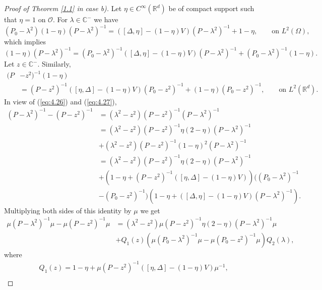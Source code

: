 \documentclass[11pt]{amsart}
\numberwithin{equation}{section}
\def\R{{\mathbb R}}
\begin{document}
\begin{proof}[Proof of Theorem \ref{1.1} in case b)]
Let $\eta\in C^\infty(\mathbb{R}^d)$ be of compact support such that
$\eta =1$ on $\mathcal{O}$.  For $\lambda\in\mathbb{C}^-$ we have
 \begin{equation*}
(P_0-\lambda^2)(1-\eta)(P-\lambda^2)^{-1}=([\Delta,\eta]-(1-\eta)V)(P-\lambda^2)^{-1}+1-\eta, \qquad \text{on } L^2(\Omega),
 \end{equation*}
which implies
\begin{equation}\label{eq:4.26}
(1-\eta)(P-\lambda^2)^{-1} =(P_0-\lambda^2)^{-1}([\Delta,\eta]-(1-\eta)V)(P-\lambda^2)^{-1}+(P_0-\lambda^2)^{-1}(1-\eta).
\end{equation}
Let $z\in\mathbb{C}^-$. Similarly,
\begin{equation}\label{eq:4.27}
\begin{split}
(P&-z^2)^{-1}(1-\eta)\\
&=(P-z^2)^{-1}([\eta,\Delta]-(1-\eta)V)(P_0-z^2)^{-1}+(1-\eta)(P_0-z^2)^{-1}, \qquad \text{on } L^2(\R^d).
\end{split}
\end{equation}
 In view of (\ref{eq:4.26}) and (\ref{eq:4.27}),
 \begin{equation*}
 \begin{split}
(P-\lambda^2)^{-1}-(P-z^2)^{-1}&=(\lambda^2-z^2)(P-z^2)^{-1}(P-\lambda^2)^{-1}\\
&=(\lambda^2-z^2)(P-z^2)^{-1}\eta(2-\eta)(P-\lambda^2)^{-1}\\
&+(\lambda^2-z^2)(P-z^2)^{-1}(1-\eta)^2(P-\lambda^2)^{-1}\\
&=(\lambda^2-z^2)(P-z^2)^{-1}\eta(2-\eta)(P-\lambda^2)^{-1}\\
&+(1-\eta+(P-z^2)^{-1}( [\eta,\Delta]-(1-\eta)V))((P_0-\lambda^2)^{-1}\\
&-(P_0-z^2)^{-1})(1-\eta+([\Delta,\eta]-(1-\eta)V)(P-\lambda^2)^{-1}).
\end{split}
 \end{equation*}
Multiplying both sides of this identity by $\mu$ we get
\begin{equation}\label{eq:4.28}
\begin{split}
\mu(P-\lambda^2)^{-1}\mu-\mu(P-z^2)^{-1}\mu&=(\lambda^2-z^2)\mu(P-z^2)^{-1}\eta(2-\eta)(P-\lambda^2)^{-1}\mu\\
 &+Q_1(z)(\mu(P_0-\lambda^2)^{-1}\mu-\mu(P_0-z^2)^{-1}\mu)Q_2(\lambda),
 \end{split}
 \end{equation}
 where 
 \begin{align*}
& Q_1(z)=1-\eta+\mu(P-z^2)^{-1}([\eta,\Delta]-(1-\eta)V)\mu^{-1},\\

\end{align*}
\end{proof}
\end{document}
